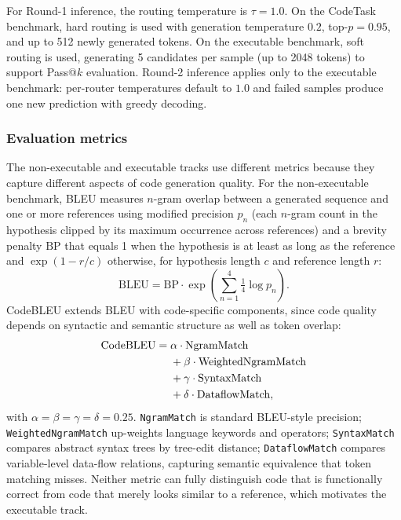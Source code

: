For Round-1 inference, the routing temperature is $\tau=1.0$. On the CodeTask benchmark, hard routing is used with generation temperature $0.2$, top-$p=0.95$, and up to 512 newly generated tokens. On the executable benchmark, soft routing is used, generating 5 candidates per sample (up to 2048 tokens) to support Pass@$k$ evaluation. Round-2 inference applies only to the executable benchmark: per-router temperatures default to $1.0$ and failed samples produce one new prediction with greedy decoding.

\subsubsection{Evaluation metrics}
\label{sec:metrics}

The non-executable and executable tracks use different metrics because they capture different aspects of code generation quality. For the non-executable benchmark, BLEU \citep{papineni2002bleu} measures $n$-gram overlap between a generated sequence and one or more references using modified precision $p_n$ (each $n$-gram count in the hypothesis clipped by its maximum occurrence across references) and a brevity penalty $\mathrm{BP}$ that equals 1 when the hypothesis is at least as long as the reference and $\exp(1-r/c)$ otherwise, for hypothesis length $c$ and reference length $r$:
\begin{equation}
\mathrm{BLEU} = \mathrm{BP} \cdot \exp\!\left(\sum_{n=1}^{4} \tfrac{1}{4} \log p_n\right).
\label{eq:bleu}
\end{equation}
CodeBLEU \citep{ren2020codebleu} extends BLEU with code-specific components, since code quality depends on syntactic and semantic structure as well as token overlap:
\begin{align}
\mathrm{CodeBLEU} ={} & \alpha \cdot \mathrm{NgramMatch} \notag \\
& + \beta \cdot \mathrm{WeightedNgramMatch} \notag \\
& + \gamma \cdot \mathrm{SyntaxMatch} \notag \\
& + \delta \cdot \mathrm{DataflowMatch},
\label{eq:codebleu}
\end{align}
with $\alpha=\beta=\gamma=\delta=0.25$. \texttt{NgramMatch} is standard BLEU-style precision; \texttt{WeightedNgramMatch} up-weights language keywords and operators; \texttt{SyntaxMatch} compares abstract syntax trees by tree-edit distance; \texttt{DataflowMatch} compares variable-level data-flow relations, capturing semantic equivalence that token matching misses. Neither metric can fully distinguish code that is functionally correct from code that merely looks similar to a reference, which motivates the executable track.

